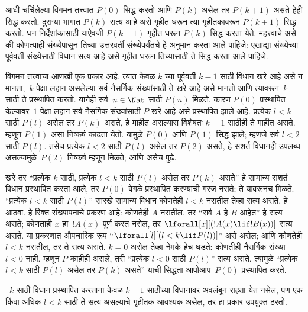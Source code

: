 \documentclass[../../../include/open-logic-section]{subfiles}
\begin{document}


आधी चर्चिलेल्या विगमन तत्त्वात $P(0)$ सिद्ध करतो आणि $P(k)$ असेल तर $P(k+1)$ असते हेही सिद्ध करतो. दुसऱ्या भागात $P(k)$ सत्य आहे असे गृहीत धरून त्या गृहीतकावरून $P(k+1)$ सिद्ध करतो. धन निर्देशांकासाठी याऐवजी $P(k-1)$ गृहीत धरून $P(k)$ सिद्ध करता येते. महत्त्वाचे असे की कोणत्याही संख्येपासून तिच्या उत्तरवर्ती संख्येपर्यंतचे हे अनुमान करता आले पाहिजे: एखाद्या संख्येच्या पूर्ववर्ती संख्येसाठी विधान सत्य आहे असे गृहीत धरून तिच्यासाठी ते सिद्ध करता आले पाहिजे.

विगमन तत्त्वाचा आणखी एक प्रकार आहे. त्यात केवळ $k$ च्या पूर्ववर्ती $k-1$ साठी विधान खरे आहे असे न मानता,~$k$ पेक्षा लहान असलेल्या सर्व नैसर्गिक संख्यांसाठी ते खरे आहे असे मानतो आणि त्यावरून~$k$ साठी ते प्रस्थापित करतो. यानेही सर्व~$n \in \Nat$ साठी $P(n)$ मिळते. कारण $P(0)$ प्रस्थापित केल्यावर~$1$ पेक्षा लहान सर्व नैसर्गिक संख्यांसाठी $P$ खरे आहे असे प्रस्थापित झाले आहे. प्रत्येक $l<k$ साठी $P(l)$ असेल तर $P(k)$ असते, हे माहीत असल्यास विशेषतः $k=1$ साठीही ते माहीत असते. म्हणून $P(1)$ असा निष्कर्ष काढता येतो. यामुळे $P(0)$ आणि $P(1)$ सिद्ध झाले; म्हणजे सर्व $l<2$ साठी $P(l)$. तसेच प्रत्येक $l<2$ साठी $P(l)$ असेल तर $P(2)$ असते, हे सशर्त विधानही उपलब्ध असल्यामुळे~$P(2)$ निष्कर्ष म्हणून मिळते; आणि असेच पुढे.

खरे तर “प्रत्येक $k$ साठी, प्रत्येक $l<k$ साठी $P(l)$ असेल तर $P(k)$ असते” हे सामान्य सशर्त विधान प्रस्थापित करता आले, तर $P(0)$ वेगळे प्रस्थापित करण्याची गरज नसते; ते यावरूनच मिळते. “प्रत्येक $l<k$ साठी $P(l)$” सारखे सामान्य विधान कोणतेही $l<k$ नसतील तेव्हा सत्य असते, हे आठवा. हे रिक्त संख्यापनाचे प्रकरण आहे: कोणतेही $A$ नसतील, तर “सर्व $A$ हे $B$ आहेत” हे सत्य असते; कोणताही $x$ हा~$!A(x)$ पूर्ण करत नसेल, तर $\lforall[x][(!A(x) \lif !B(x))]$ सत्य असते. या प्रकरणात औपचारिक रूप “$\lforall[l][(l < k \lif P(l))]$” असे असेल; आणि कोणतेही $l < k$ नसतील, तर ते सत्य असते. $k=0$ असेल तेव्हा नेमके हेच घडते: कोणतीही नैसर्गिक संख्या $l<0$ नाही. म्हणून $P$ काहीही असले, तरी “प्रत्येक $l<0$ साठी $P(l)$” सत्य असते. त्यामुळे “प्रत्येक $l<k$ साठी $P(l)$ असेल तर $P(k)$ असते” याची सिद्धता आपोआप~$P(0)$ प्रस्थापित करते.

~$k$ साठी विधान प्रस्थापित करताना केवळ $k-1$ साठीच्या विधानावर अवलंबून राहता येत नसेल, पण एक किंवा अधिक $l<k$ साठी ते सत्य असल्याचे गृहीतक आवश्यक असेल, तर हा प्रकार उपयुक्त ठरतो.
\end{document}
